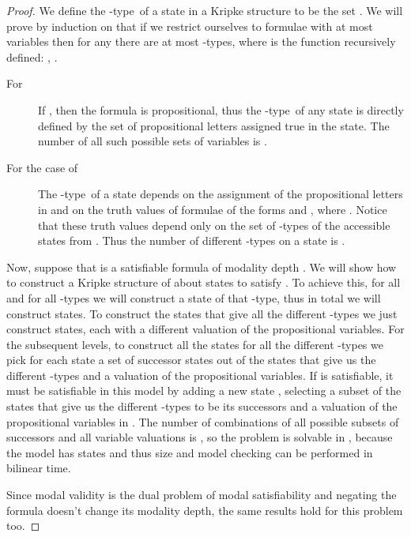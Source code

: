 \documentclass{llncs}
\newcommand{\palto}{type}
\begin{document}
\begin{proof}
We define the -\palto\ of a state  in a Kripke structure  to
be the set .
We will prove by induction on  that if we restrict ourselves to formulae
with at most  variables then for any  there are at most 
-\palto s, where  is the function recursively defined: ,
\hbox{}.

\begin{description}
\item[For ] If , then the formula is propositional, thus
the -\palto\ of any state is directly defined by the set of propositional
letters assigned true in the state. The number of all such possible sets of
variables is .
\item[For the case of ] The -\palto\ of
a state  depends on the assignment of the propositional letters in  and
on the truth values of formulae of the forms  and ,
where . Notice that these truth values depend only on the set
of -\palto s of the accessible states from . Thus the number of different
-\palto s on a state  is .
\end{description}

Now, suppose that  is a satisfiable formula of modality depth .
We will show how to construct a Kripke structure of about  states to
satisfy . To achieve this, for all  and for all
-types we will construct a state of that -type, thus in total we will
construct  states. To construct the
 states that give all the different -types we just construct
 states, each with a different valuation of the propositional variables.
For the subsequent levels, to construct all the states for all the different
-types we pick for each state a set of successor states out of the
states that give us the different -types and a valuation of the
propositional variables. If  is satisfiable, it must be satisfiable in
this model by adding a new state , selecting a subset of the states that
give us the different -types to be its successors and a valuation of the
propositional variables in . The number of combinations of all possible
subsets of successors and all variable valuations is , so the problem
is solvable in , because the model has
 states and thus size  and model checking can be
performed in bilinear time.

Since modal validity is the dual problem of modal satisfiability and negating
the formula doesn't change its modality depth, the same results hold for this
problem too.

\end{proof}
\end{document}
